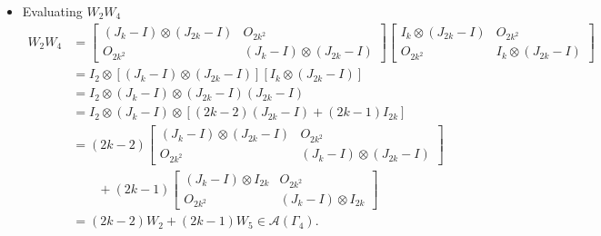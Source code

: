 \begin{itemize}
    \item Evaluating \( W_2 W_4 \)
    \begin{align*}
        W_2 W_4
        &=\begin{bmatrix}
            (J_k -I) \otimes (J_{2k} -I) & O_{2k^2}\\
            O_{2k^2} & (J_k -I) \otimes (J_{2k} -I)
        \end{bmatrix} \begin{bmatrix}
            I_k \otimes (J_{2k} -I) & O_{2k^2}\\
            O_{2k^2} & I_k \otimes (J_{2k} -I)
        \end{bmatrix}\\
        &= I_2 \otimes [(J_k -I) \otimes (J_{2k} -I)][I_k \otimes (J_{2k} -I)]\\
        &= I_2 \otimes (J_k -I) \otimes (J_{2k} -I)(J_{2k} -I) \\
        &= I_2 \otimes (J_k -I) \otimes [(2k-2)(J_{2k}-I) + (2k-1)I_{2k}] \\
        &= (2k-2)\begin{bmatrix}
            (J_k -I) \otimes (J_{2k} -I) & O_{2k^2}\\
            O_{2k^2} & (J_k -I) \otimes (J_{2k} -I)
        \end{bmatrix} \\
        &\quad\quad+(2k-1)\begin{bmatrix}
            (J_k -I) \otimes I_{2k} & O_{2k^2}\\
            O_{2k^2} & (J_k -I) \otimes I_{2k}
        \end{bmatrix}\\
        &= (2k-2)W_2 + (2k-1)W_5\in\mathcal{A}(\Gamma_4).
    \end{align*}
    

\end{itemize}

